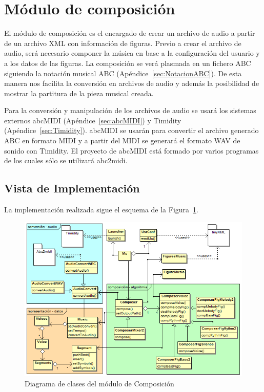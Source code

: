 \section{Módulo de composición}
\label{sec:modcomp}


El módulo de composición es el encargado de crear un archivo de audio a partir de un archivo XML con información de figuras. Previo a crear el archivo de audio, será necesario componer la música en base a la configuración del usuario y a los datos de las figuras. La composición se verá plasmada en un fichero ABC siguiendo la notación musical ABC (Apéndice~\ref{sec:NotacionABC}). De esta manera nos facilita la conversión en archivos de audio y además la posibilidad de mostrar la partitura de la pieza musical creada.

Para la conversión y manipulación de los archivos de audio se usará los sistemas externos abcMIDI (Apéndice~\ref{sec:abcMIDI}) y Timidity (Apéndice~\ref{sec:Timidity}). abcMIDI se usarán para convertir el archivo generado ABC en formato MIDI y a partir del MIDI se generará el formato WAV de sonido con Timidity. El proyecto de abcMIDI está formado por varios programas de los cuales sólo se utilizará abc2midi.

\subsection{Vista de Implementación}
La implementación realizada sigue el esquema de la Figura~\ref{fig:diagramaclasesMu}.\\

		\begin{figure}[!htbp]
		\centering
		\hspace*{0.0in}
		\includegraphics[scale=0.56]{graphics/diagramaclasesMU.png}
		\caption{Diagrama de clases del módulo de Composición}
		\label{fig:diagramaclasesMu}
		\end{figure}

